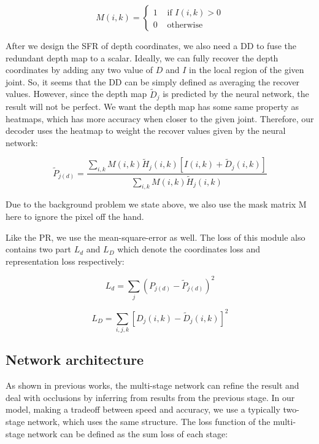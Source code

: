 \documentclass[journal]{IEEEtran}
\begin{document}
\begin{equation}
  M(i, k)=\left\{\begin{array}{ll}{1} & {\text { if } I(i, k)>0} \\ {0} & {\text { otherwise }}\end{array}\right.
\end{equation}

After we design the SFR of depth coordinates, we also need a DD to fuse the redundant depth map to a scalar. 
Ideally, we can fully recover the depth coordinates by adding any two value of $D$ and $I$ in the local region of the given joint. 
So, it seems that the DD can be simply defined as averaging the recover values. 
However, since the depth map $\tilde{D}_{j}$ is predicted by the neural network, the result will not be perfect. 
We want the depth map has some same property as heatmaps, which has more accuracy when closer to the given joint. 
Therefore, our decoder uses the heatmap to weight the recover values given by the neural network:

\begin{equation}
  \tilde{P}_{j(d)}=\frac{\sum_{i, k} M(i, k) \tilde{H}_{j}(i, k)\left[I(i, k)+\tilde{D}_{j}(i, k)\right]}{\sum_{i, k} M(i, k) \tilde{H}_{j}(i, k)}
\end{equation}

Due to the background problem we state above, we also use the mask matrix M here to ignore the pixel off the hand.
 
Like the PR, we use the mean-square-error as well. 
The loss of this module also contains two part $L_{d}$ and $L_{D}$ which denote the coordinates loss and representation loss respectively:

\begin{equation}
  L_{d}=\sum_{j}\left(P_{j(d)}-\tilde{P}_{j(d)}\right)^{2}
\end{equation}

\begin{equation}
  L_{D}=\sum_{i, j, k}\left[D_{j}(i, k)-\tilde{D}_{j}(i, k)\right]^{2}
\end{equation}

\subsection{Network architecture}

As shown in previous works\cite{wei2016convolutional, chen2017pose, wan2018dense, bulat2016human}, 
the multi-stage network can refine the result and 
deal with occlusions by inferring from results from the previous stage. 
In our model, making a tradeoff between speed and accuracy, we use a typically two-stage network, which uses the same structure. 
The loss function of the multi-stage network can be defined as the sum loss of each stage:
\end{document}
